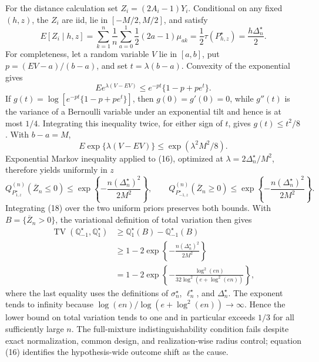 For the distance calculation set \(Z_i=(2A_i-1)Y_i\).  Conditional on any fixed \((h,z)\), the \(Z_i\) are iid, lie in \([-M/2,M/2]\), and satisfy
\[
 E[Z_i\mid h,z]
 =\sum_{k=1}^n\frac1n\sum_{a=0}^1\frac12(2a-1)\mu_{ak}
 =\frac12\tau(P_{h,z}^\star)
 =\frac{h\Delta_n^\star}{2}. \tag{16}
\]
For completeness, let a random variable \(V\) lie in \([a,b]\), put \(p=(EV-a)/(b-a)\), and set \(t=\lambda(b-a)\).  Convexity of the exponential gives
\[
 E e^{\lambda(V-EV)}
 \leq e^{-pt}\{1-p+pe^t\}.
\]
If \(g(t)=\log[e^{-pt}\{1-p+pe^t\}]\), then \(g(0)=g'(0)=0\), while \(g''(t)\) is the variance of a Bernoulli variable under an exponential tilt and hence is at most \(1/4\).  Integrating this inequality twice, for either sign of \(t\), gives \(g(t)\leq t^2/8\).  With \(b-a=M\),
\[
 E\exp\{\lambda(V-EV)\}\leq\exp(\lambda^2M^2/8). \tag{17}
\]
Exponential Markov inequality applied to (16), optimized at \(\lambda=2\Delta_n^\star/M^2\), therefore yields uniformly in \(z\)
\[
 Q_{P_{1,z}^\star}^{(n)}(\overline Z_n\leq0)
 \leq\exp\left\{-\frac{n(\Delta_n^\star)^2}{2M^2}\right\},
 \qquad
 Q_{P_{-1,z}^\star}^{(n)}(\overline Z_n\geq0)
 \leq\exp\left\{-\frac{n(\Delta_n^\star)^2}{2M^2}\right\}. \tag{18}
\]
Integrating (18) over the two uniform priors preserves both bounds.  With \(B=\{\overline Z_n>0\}\), the variational definition of total variation then gives
\[
 \begin{aligned}
 \operatorname{TV}(\mathbb Q_{-1}^\star,\mathbb Q_1^\star)
 &\geq \mathbb Q_1^\star(B)-\mathbb Q_{-1}^\star(B)\\
 &\geq1-2\exp\left\{-\frac{n(\Delta_n^\star)^2}{2M^2}\right\}\\
 &=1-2\exp\left\{-\frac{\log^2(en)}{32\log^2(e+\log^2(en))}\right\},
 \end{aligned}
\]
where the last equality uses the definitions of \(\sigma_n^\star\), \(\ell_n^\star\), and \(\Delta_n^\star\).  The exponent tends to infinity because \(\log(en)/\log(e+\log^2(en))\to\infty\).  Hence the lower bound on total variation tends to one and in particular exceeds \(1/3\) for all sufficiently large \(n\).  The full-mixture indistinguishability condition fails despite exact normalization, common design, and realization-wise radius control; equation (16) identifies the hypothesis-wide outcome shift as the cause.

